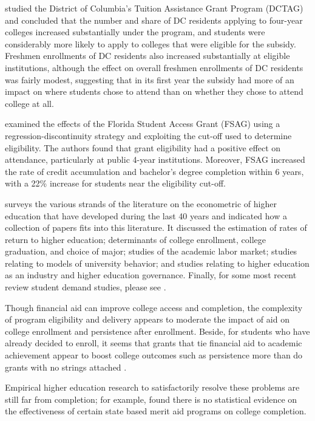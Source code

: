 \documentclass[12pt,english]{report}
\begin{document}
\citet{Abraham2006} studied the District of Columbia's Tuition Assistance Grant
Program (DCTAG) and concluded that the number and share of DC residents
applying to four-year colleges increased substantially under the program, and
students were considerably more likely to apply to colleges that were eligible
for the subsidy. Freshmen enrollments of DC residents also increased
substantially at eligible institutions, although the effect on overall freshmen
enrollments of DC residents was fairly modest, suggesting that in its first
year the subsidy had more of an impact on where students chose to attend than
on whether they chose to attend college at all.

\citet{Castleman2016} examined the effects of the Florida Student Access Grant
(FSAG) using a regression-discontinuity strategy and exploiting the cut-off
used to determine eligibility. The authors found that grant eligibility had a
positive effect on attendance, particularly at public 4-year institutions.
Moreover, FSAG increased the rate of credit accumulation and bachelor’s degree
completion within 6 years, with a 22\% increase for students near the
eligibility cut-off.

\citet{Ehrenberg2004} surveys the various strands of the literature on the
econometric of higher education that have developed during the last 40 years
and indicated how a collection of papers fits into this literature. It
discussed the estimation of rates of return to higher education; determinants
of college enrollment, college graduation, and choice of major; studies of the
academic labor market; studies relating to models of university behavior; and
studies relating to higher education as an industry and higher education
governance.  Finally, for some most recent review student demand studies,
please see \citep{Dynarski2002, Dynarski2003, Dynarski2000, Dynarski2013}.

Though financial aid can improve college access and completion, the complexity
of program eligibility and delivery appears to moderate the impact of aid on
college enrollment and persistence after enrollment. Beside, for students who
have already decided to enroll, it seems that grants that tie financial aid to
academic achievement appear to boost college outcomes such as persistence more
than do grants with no strings attached \citep{Dynarski2013}.

Empirical higher education research  to satisfactorily resolve these problems
are still far from completion; for example, \citet{Winters2015} found there is
no statistical evidence on the effectiveness of certain state based merit aid
programs on college completion.
\end{document}
